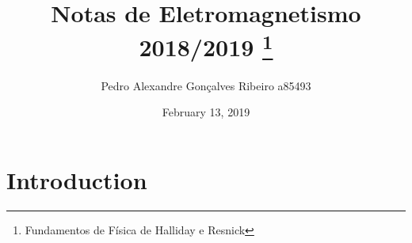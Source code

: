 \documentclass{article}
\title{Notas de Eletromagnetismo 2018/2019 \thanks{Fundamentos de Física de Halliday e Resnick}}
\author{Pedro Alexandre Gonçalves Ribeiro a85493}
\date{February 13, 2019}
\begin{document}
\maketitle
\tableofcontents
\section{Introduction}
\end{document}
